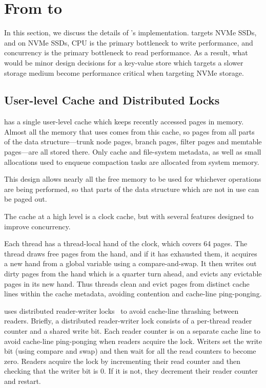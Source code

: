 \section{From \datastructs to \sysname}\label{sec:details} 
In this section, we discuss the details of \sysname's implementation. \sysname
targets NVMe SSDs, and on NVMe SSDs, CPU is the primary bottleneck to
write performance, and concurrency is the primary bottleneck to read
performance. As a result, what would be minor design decisions for a key-value
store which targets a slower storage medium become performance critical when
targeting NVMe storage.

\subsection{User-level Cache and Distributed Locks}\label{sec:cache}

\sysname{} has a single user-level cache which keeps recently accessed pages in
memory. Almost all the memory that \sysname uses comes from this cache, so
pages from all parts of the data structure---trunk node pages, branch pages,
filter pages and memtable pages---are all stored there. Only cache and
file-system metadata, as well as small allocations used to enqueue compaction
tasks are allocated from system memory.

This design allows nearly all the free memory to be used for whichever
operations are being performed, so that parts of the data structure which are
not in use can be paged out.

The cache at a high level is a clock cache, but with several features designed
to improve concurrency.

Each thread has a thread-local hand of the clock, which covers 64 pages. The
thread draws free pages from the hand, and if it has exhausted them, it
acquires a new hand from a global variable using a compare-and-swap. It then
writes out dirty pages from the hand which is a quarter turn ahead, and
evicts any evictable pages in its new hand. Thus threads clean and evict pages
from distinct cache lines within the cache metadata, avoiding contention and
cache-line ping-ponging.

\sysname uses distributed reader-writer locks~\cite{DBLP:conf/ipps/HsiehW92} to
avoid cache-line thrashing between readers.  Briefly, a distributed
reader-writer lock consists of a per-thread reader counter and a shared write
bit.  Each reader counter is on a separate cache line to avoid cache-line
ping-ponging when readers acquire the lock.  Writers set the write bit (using
compare and swap) and then wait for all the read counters to become zero.
Readers acquire the lock by incrementing their read counter and then checking
that the writer bit is 0.  If it is not, they decrement their reader counter
and restart.

